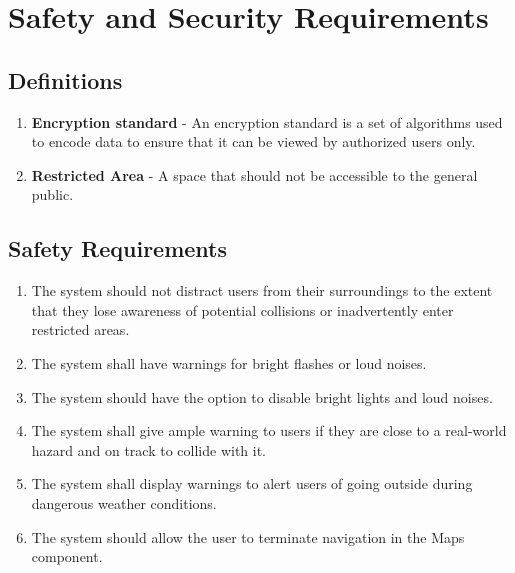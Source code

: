 \documentclass{article}
\begin{document}
\pagebreak

\section{Safety and Security Requirements}

\subsection{Definitions}
\label{ssub:def}

\begin{enumerate}
    \item \textbf{Encryption standard} \label{encryption standard} - An encryption standard is a set of algorithms used to encode data to ensure that it can be viewed by authorized users only.
    \item \textbf{Restricted Area} \label{restricted area} - A space that should not be accessible to the general public.
\end{enumerate}

\subsection{Safety Requirements}

\begin{enumerate}[label=\textbf{SAR-\arabic*},ref=SAR-\arabic*]
    \item \label{SAR-1} The system should not distract users from their surroundings to the extent that they lose awareness of potential collisions or inadvertently enter restricted areas. \\
    \item \label{SAR-2} The system shall have warnings for bright flashes or loud noises. \\
    \item \label{SAR-3} The system should have the option to disable bright lights and loud noises. \\
    \item \label{SAR-4} The system shall give ample warning to users if they are close to a real-world hazard and on track to collide with it. \\
    \item \label{SAR-5} The system shall display warnings to alert users of going outside during dangerous weather conditions. \\
    \item \label{SAR-6} The system should allow the user to terminate navigation in the Maps component. \\
\end{enumerate}
\end{document}
